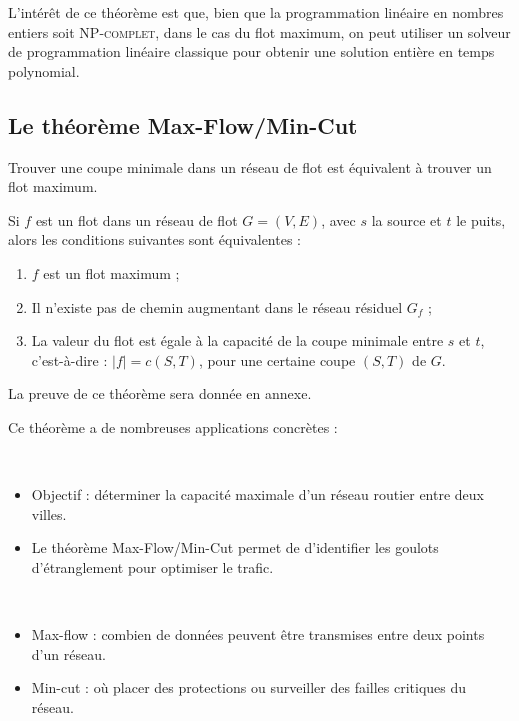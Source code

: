 \documentclass[a4paper]{article}
\begin{document}
L'intérêt de ce théorème est que, bien que la programmation linéaire en nombres entiers soit \textsc{NP-complet}, dans le cas du flot maximum, on peut utiliser un solveur de programmation linéaire classique pour obtenir une solution entière en temps polynomial.
\subsection{Le théorème Max-Flow/Min-Cut}
Trouver une coupe minimale dans un réseau de flot est équivalent à trouver un flot maximum.
\begin{theorem}
	Si $f$ est un flot dans un réseau de flot $G = (V, E)$, avec $s$ la source et $t$ le puits, alors les conditions suivantes sont équivalentes :
	\begin{enumerate}
		\item $f$ est un flot maximum ;
		\item Il n'existe pas de chemin augmentant dans le réseau résiduel $G_f$ ;
		\item La valeur du flot est égale à la capacité de la coupe minimale entre $s$ et $t$, c'est-à-dire : $|f| = c(S, T)$, pour une certaine coupe $(S, T)$ de $G$.
	\end{enumerate}
\end{theorem}
La preuve de ce théorème sera donnée en annexe.

Ce théorème a de nombreuses applications concrètes :
\begin{eg}\,

	\begin{itemize}[label={\color{gray}\small \textbullet}]
		\item Objectif : déterminer la capacité maximale d'un réseau routier entre deux villes.
		\item Le théorème Max-Flow/Min-Cut permet de d'identifier les goulots d'étranglement pour optimiser le trafic.
	\end{itemize}
\end{eg}
\begin{eg}\,

	\begin{itemize}[label={\color{gray}\small \textbullet}]
		\item Max-flow : combien de données peuvent être transmises entre deux points d'un réseau.
		\item Min-cut : où placer des protections ou surveiller des failles critiques du réseau.
	\end{itemize}
\end{eg}
\end{document}
